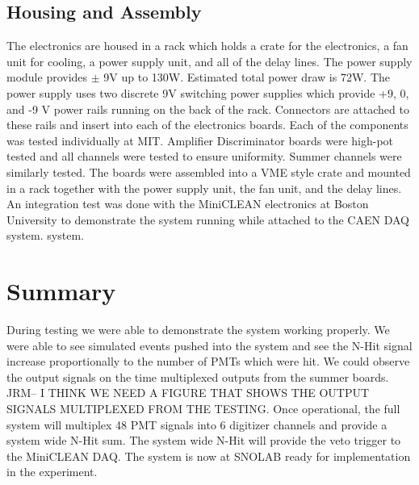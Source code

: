 \documentclass[preprint,12pt]{elsarticle}
\begin{document}
\subsection{Housing and Assembly}
\label{sec:Housing}
%
The electronics are housed in a rack which holds a crate for the
electronics, a fan unit for cooling, a power supply unit, and all of
the delay lines.  The power supply module provides $\pm$ 9V up to
130W.  Estimated total power draw is 72W.  The power supply uses two
discrete 9V switching power supplies which provide +9, 0, and -9 V
power rails running on the back of the rack.  Connectors are attached
to these rails and insert into each of the electronics boards.  Each
of the components was tested individually at MIT.  Amplifier
Discriminator boards were high-pot tested and all channels were tested
to ensure uniformity.  Summer channels were similarly tested.  The
boards were assembled into a VME style crate and mounted in a rack
together with the power supply unit, the fan unit, and the delay
lines.  An integration test was done with the MiniCLEAN electronics
at Boston University to
demonstrate the system running while attached to the CAEN DAQ system.
system.

\section{Summary}
\label{Summary}
%
During testing we were able to demonstrate the system working
properly.  We were able to see simulated events pushed into the system
and see the N-Hit signal increase proportionally to the number of PMTs
which were hit.  We could observe the output signals on the time
multiplexed outputs from the summer boards.  JRM-- I THINK WE NEED A FIGURE THAT SHOWS THE OUTPUT SIGNALS MULTIPLEXED FROM THE TESTING.  Once operational, the
full system will multiplex 48 PMT signals into 6 digitizer channels
and provide a system wide N-Hit sum.  The system wide N-Hit will
provide the veto trigger to the MiniCLEAN DAQ.  The system is now at
SNOLAB ready for implementation in the experiment.
\end{document}
